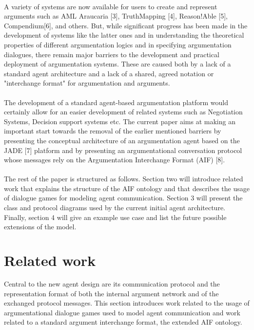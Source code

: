 \documentclass[twoside, 11pt, a4paper]{article}
\begin{document}
\paragraph*{}
A variety of systems are now available for users to create and represent arguments such as AML Araucaria [3],  TruthMapping [4], Reason!Able [5], Compendium[6], and others. But, while significant progress has been made in the development of systems
like the latter ones and in understanding the theoretical properties of different argumentation logics and in specifying argumentation dialogues, there remain major barriers to the development and practical deployment of argumentation systems.
These are caused both by a lack of a standard agent architecture and a lack of a shared, agreed notation or "interchange format" for argumentation and arguments. 

\paragraph*{}
The development of a standard agent-based argumentation platform would certainly allow for an easier development of related systems such as Negotiation Systems, Decision support systems etc.
The current paper aims at making an important start towards the removal of the earlier mentioned barriers by presenting the conceptual architecture
of an argumentation agent based on the JADE [7] platform and by presenting an argumentational conversation protocol whose messages rely on the Argumentation Interchange Format (AIF) [8].

\paragraph*{}
The rest of the paper is structured as follows. Section two will introduce related work that explains the structure of the AIF ontology and that describes the usage of dialogue games for modeling agent communication. Section 3 will present the class and protocol diagrams used by the current initial agent architecture. Finally, section 4 will give an example use case and list the future possible extensions of the model.

\section{Related work}
Central to the new agent design are its communication protocol and the representation format of both the internal argument network
and of the exchanged protocol messages. This section introduces work related to the usage of argumentational dialogue games used 
to model agent communication and work related to a standard argument interchange format, the extended AIF ontology.
\end{document}
